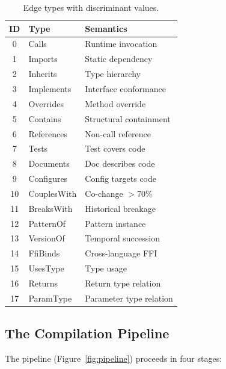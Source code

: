 \documentclass[10pt, twocolumn]{article}
\begin{document}
\begin{table}[t]
\caption{Edge types with discriminant values.}
\label{tab:edgetypes}
\centering
\scriptsize
\begin{tabular}{@{}clp{2.8cm}@{}}
\toprule
\textbf{ID} & \textbf{Type} & \textbf{Semantics} \\
\midrule
0  & Calls       & Runtime invocation \\
1  & Imports     & Static dependency \\
2  & Inherits    & Type hierarchy \\
3  & Implements  & Interface conformance \\
4  & Overrides   & Method override \\
5  & Contains    & Structural containment \\
6  & References  & Non-call reference \\
7  & Tests       & Test covers code \\
8  & Documents   & Doc describes code \\
9  & Configures  & Config targets code \\
10 & CouplesWith & Co-change $>$70\% \\
11 & BreaksWith  & Historical breakage \\
12 & PatternOf   & Pattern instance \\
13 & VersionOf   & Temporal succession \\
14 & FfiBinds    & Cross-language FFI \\
15 & UsesType    & Type usage \\
16 & Returns     & Return type relation \\
17 & ParamType   & Parameter type relation \\
\bottomrule
\end{tabular}
\end{table}


\subsection{The Compilation Pipeline}
\label{sec:pipeline}

The pipeline (Figure~\ref{fig:pipeline}) proceeds in four stages:
\end{document}

